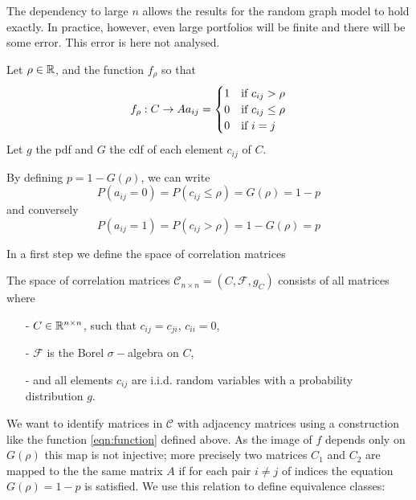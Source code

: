 \begin{remark}The dependency to large $n$ allows the results for the random graph model to hold exactly.
In practice, however, even large portfolios will be finite and there will be some error. This error is here not analysed.
\end{remark}




\begin{definition}
\label{def:equivalence_aux} 
Let $\rho \in {\mathbb R}$, and the function $f_\rho$ so that
\begin{equation}
\label{eqn:function}
f_\rho: C \rightarrow A\\
\\
a_{ij} = \begin{cases} 1 & \text{if } c_{ij} > \rho \\
                       0 & \text{if } c_{ij} \le \rho \\
                       0 & \text{if } i = j
        \end{cases}
\end{equation}
Let $g$ the pdf and $G$ the cdf of each element $c_{ij}$ of $C$.

By defining $p = 1-G(\rho)$, we can write
$$
P( a_{ij} = 0 ) = P(c_{ij} \le \rho) = G(\rho) = 1-p
$$
and conversely
$$
P( a_{ij} = 1 ) = P(c_{ij} > \rho) = 1 - G(\rho) = p
$$
\end{definition}

In a first step we define the space of correlation matrices 
\begin{definition}
The space of correlation matrices $\mathcal{C}_{n\times n} = \left( C, \mathcal{F},  g_C \right)$ consists of all matrices where
\begin{itemize}
\item[-] $C \in {\mathbb R}^{n \times n}$, such that $c_{ij} = c_{ji}$, $c_{ii} = 0$, 
\item[-] $\mathcal{F}$ is the Borel $\sigma-$algebra on $C$,
\item[-] and all elements $c_{ij}$ are i.i.d. random variables with a probability distribution $g$.
\end{itemize}
\end{definition}

We want to identify matrices in $\mathcal{C}$ with adjacency matrices using a construction like the function \ref{eqn:function} defined above.
As the image of $f$ depends only on $G(\rho)$  this map is not injective; more precisely two matrices $C_1$ and $C_2$ are mapped to the the same matrix $A$ if for each pair $i\neq j$ of indices the equation  $G(\rho) = 1-p$ is satisfied.
We use this relation to define equivalence classes:

